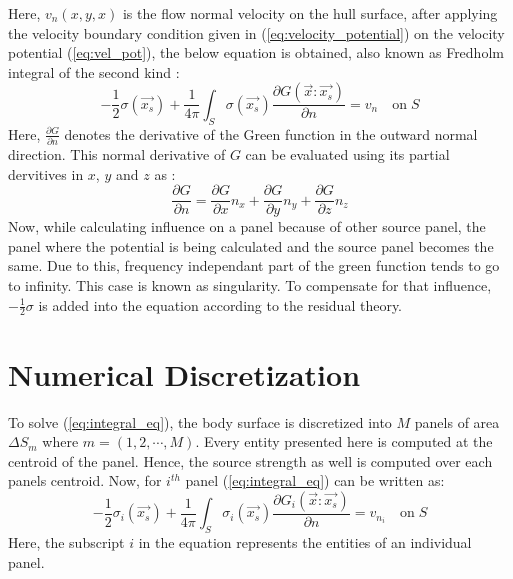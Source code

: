 Here, $v_n(x, y, x)$ is the flow normal velocity on the hull surface, after applying the 
velocity boundary condition given in (\ref{eq:velocity_potential}) on the velocity 
potential (\ref{eq:vel_pot}), the below equation is obtained, also known as Fredholm integral 
of the second kind :
\begin{equation}
    \label{eq:integral_eq}
    -\frac{1}{2}\sigma(\vec{x_s}) + \frac{1}{4\pi}\int_S\sigma(\vec{x_s})\frac{\partial G(\vec{x}:\vec{x_s})}{\partial n} = v_n \quad \text{on}\; S
\end{equation}
Here, $\frac{\partial G}{\partial n}$ denotes the derivative of the Green function in the outward normal direction. This normal derivative of $G$ can be 
evaluated using its partial dervitives in $x$, $y$ and $z$ as :
\begin{equation}
    \frac{\partial G}{\partial n} = \frac{\partial G}{\partial x}n_x + \frac{\partial G}{\partial y}n_y + \frac{\partial G}{\partial z}n_z
\end{equation}
Now, while calculating influence on a panel because of other source panel, the panel where the 
potential is being calculated and the source panel becomes the same. Due to this, frequency 
independant part of the green function tends to go to infinity. This case is known as 
singularity. To compensate for that influence, $-\frac{1}{2}\sigma$ is added into the 
equation according to the residual theory.



\section{Numerical Discretization}
\label{sec:numerical_dis}
To solve (\ref{eq:integral_eq}), the body surface is discretized into $M$ panels of area 
$\Delta S_m$ where $m = (1, 2, \cdots, M)$. Every entity presented here is computed at the centroid of the panel.
Hence, the source strength as well is computed over each panels centroid. Now, for $i^{th}$ panel 
(\ref{eq:integral_eq}) can be written as:
\begin{equation}
    \label{eq:dis_integral_eq}
    -\frac{1}{2}\sigma_i(\vec{x_s}) + \frac{1}{4\pi}\int_S\sigma_i(\vec{x_s})\frac{\partial G_i(\vec{x}:\vec{x_s})}{\partial n} = v_{n_i} \quad \text{on}\; S
\end{equation}
Here, the subscript $i$ in the equation represents the entities of an individual panel.


